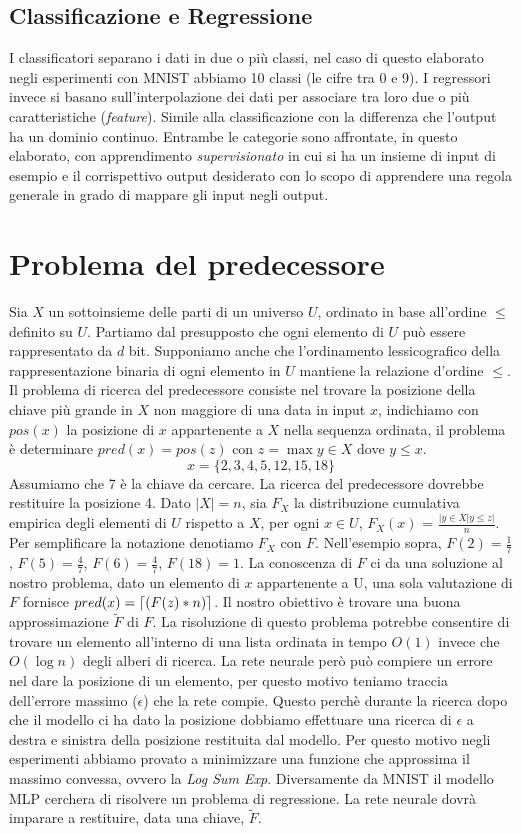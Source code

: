 \documentclass[11pt,a4paper,twoside,
openright]{book}
\DeclarePairedDelimiter{\ceil}{\lceil}{\rceil}
\begin{document}
\subsection*{Classificazione e Regressione}
I classificatori separano i dati in due o più classi, nel caso di questo elaborato negli esperimenti con MNIST abbiamo 10 classi (le cifre tra 0 e 9).
I regressori invece si basano sull'interpolazione dei dati per associare tra loro due o più caratteristiche (\textit{feature}). Simile alla classificazione con la differenza che l'output ha un dominio continuo.
Entrambe le categorie sono affrontate, in questo elaborato, con apprendimento \textit{supervisionato} in cui si ha un insieme di input di esempio e il corrispettivo output desiderato con lo scopo di apprendere una regola generale in grado di mappare gli input negli output.
\section{Problema del predecessore}

Sia $X$ un sottoinsieme delle parti di un universo $U$, ordinato in base all'ordine $\leq$ definito su $U$. Partiamo dal presupposto che ogni elemento di $U$ può essere rappresentato da $d$ bit. Supponiamo anche che l'ordinamento lessicografico della rappresentazione binaria di ogni elemento in $U$ mantiene la relazione d'ordine $\leq$. Il problema di ricerca del predecessore consiste nel trovare la posizione della chiave più grande in $X$ non maggiore di una data in input $x$, indichiamo con $pos(x)$ la posizione di $x$ appartenente a $X$ nella sequenza ordinata, il problema è determinare $pred(x)=pos(z)$ con $z = \max y \in X$ dove $y \leq x$.
\begin{equation}
x=\{2,3,4,5,12,15,18\}
\tag{Esempio}
\end{equation}
Assumiamo che 7 è la chiave da cercare. La ricerca del predecessore dovrebbe restituire la posizione 4.
Dato $|X|=n$, sia $F_{X}$ la distribuzione cumulativa empirica degli elementi di $U$ rispetto a $X$, per ogni $x\in U$, $F_X(x)$ = ${\frac{|y \in X | y \leq z|}{n}}$. Per semplificare la notazione denotiamo $F_{X}$ con $F$. Nell'esempio sopra, $F(2)=\frac{1}{7}$, $F(5)=\frac{4}{7}$, $F(6)=\frac{4}{7}$, $F(18)=1$. La conoscenza di $F$ ci da una soluzione al nostro problema, dato un elemento di $x$ appartenente a U, una sola valutazione di $F$ fornisce $pred(x)=\ceil{(F(z)*n)}$. Il nostro obiettivo è trovare una buona approssimazione $\tilde{F}$  di $F$.
La risoluzione di questo problema potrebbe consentire di trovare un elemento all'interno di una lista ordinata in tempo $O(1)$ invece che $O(\log n)$ degli alberi di ricerca.
La rete neurale però può compiere un errore nel dare la posizione di un elemento, per questo motivo teniamo traccia dell'errore massimo ($\epsilon$) che la rete compie. Questo perchè durante la ricerca dopo che il modello ci ha dato la posizione dobbiamo effettuare una ricerca di $\epsilon$ a destra e sinistra della posizione restituita dal modello. Per questo motivo negli esperimenti abbiamo provato a minimizzare una funzione che approssima il massimo convessa, ovvero la \textit{Log Sum Exp}.
Diversamente da MNIST il modello MLP cerchera di risolvere un problema di regressione. La rete neurale dovrà imparare a restituire, data una chiave, $\tilde{F}$.
\end{document}
